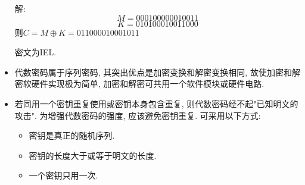 \documentclass[UTF8]{ctexart}
\begin{document}
\begin{itemize}
        解: $$M=00010 00000 10011$$
        $$K=01010 00100 11000$$
        则$C=M\oplus K=01100 00100 01011$

        密文为IEL.

        \item 代数密码属于序列密码, 其突出优点是加密变换和解密变换相同, 故使加密和解密软硬件实现极为简单, 加密和解密可共用一个软件模块或硬件电路.
        \item 若同用一个密钥重复使用或密钥本身包含重复, 则代数密码经不起"已知明文的攻击". 为增强代数密码的强度, 应该避免密钥重复. 可采用以下方式:
        \begin{itemize}
            \item 密钥是真正的随机序列.
            \item 密钥的长度大于或等于明文的长度.
            \item 一个密钥只用一次.
        \end{itemize}
    \end{itemize}
\end{document}

